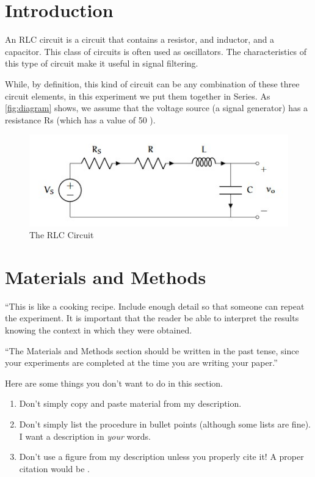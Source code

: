 \documentclass[10pt,twocolumn]{article}
\begin{document}
\section{Introduction} 
\label{sec:introduction}

An RLC circuit is a circuit that contains a resistor, and inductor, and a capacitor. This class of circuits is often used as oscillators. The characteristics of this type of circuit make it useful in signal filtering.

While, by definition, this kind of circuit can be any combination of these three circuit elements, in this experiment we put them together in Series. As \autoref{fig:diagram} shows, we assume that the voltage source (a signal generator) has a resistance Rs (which has a value of 50 \Omega).

\begin{figure}[bt]
	\centering
	\includegraphics[width=.9\linewidth]{figures/RLCDiagram.JPG}
	\caption{The RLC Circuit}
	\label{fig:diagram}
\end{figure}

\section{Materials and Methods}

``This is like a cooking recipe. Include enough detail so that someone can repeat the experiment. It is important that the reader be able to interpret the results knowing the context in which they were obtained.

``The Materials and Methods section should be written in the past tense, since your experiments are completed at the time you are writing your paper.''

Here are some things you don't want to do in this section.

\begin{enumerate}
\item 
Don't simply copy and paste material from my description. 
\item 
Don't simply list the procedure in bullet points (although some lists are fine). I want a description in \emph{your} words.
\item
Don't use a figure from my description unless you properly cite it! A proper citation would be \citep[p.~32]{Picone2018}.
\end{enumerate}
\end{document}
